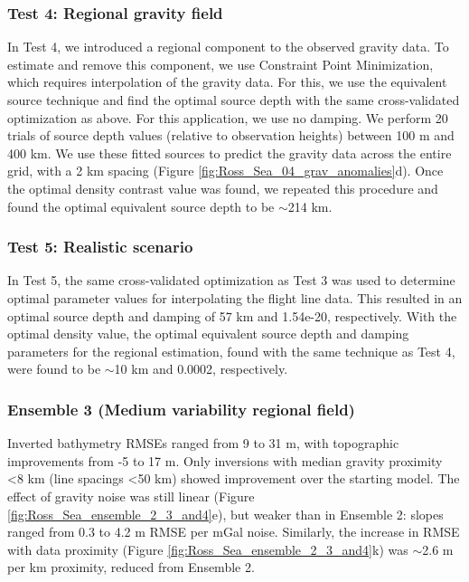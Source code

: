 \documentclass[tc, manuscript]{copernicus}
\begin{document}
\subsubsection{Test 4: Regional gravity field}
In Test 4, we introduced a regional component to the observed gravity data. To estimate and remove this component, we use Constraint Point Minimization, which requires interpolation of the gravity data. For this, we use the equivalent source technique and find the optimal source depth with the same cross-validated optimization as above. For this application, we use no damping. We perform 20 trials of source depth values (relative to observation heights) between 100 m and 400 km. We use these fitted sources to predict the gravity data across the entire grid, with a 2 km spacing (Figure \ref{fig:Ross_Sea_04_grav_anomalies}d). Once the optimal density contrast value was found, we repeated this procedure and found the optimal equivalent source depth to be $\sim$214 km.

\subsubsection{Test 5: Realistic scenario}
In Test 5, the same cross-validated optimization as Test 3 was used to determine optimal parameter values for interpolating the flight line data. This resulted in an optimal source depth and damping of 57 km and 1.54e-20, respectively. With the optimal density value, the optimal equivalent source depth and damping parameters for the regional estimation, found with the same technique as Test 4, were found to be $\sim$10 km and 0.0002, respectively.

\subsubsection{Ensemble 3 (Medium variability regional field)}\label{app:ensemble_3}
Inverted bathymetry RMSEs ranged from 9 to 31 m, with topographic improvements from -5 to 17 m. Only inversions with median gravity proximity \textless 8 km (line spacings \textless 50 km) showed improvement over the starting model. The effect of gravity noise was still linear (Figure \ref{fig:Ross_Sea_ensemble_2_3_and4}e), but weaker than in Ensemble 2: slopes ranged from 0.3 to 4.2 m RMSE per mGal noise. Similarly, the increase in RMSE with data proximity (Figure \ref{fig:Ross_Sea_ensemble_2_3_and4}k) was $\sim$2.6 m per km proximity, reduced from Ensemble 2.

\noappendix       %
\end{document}
